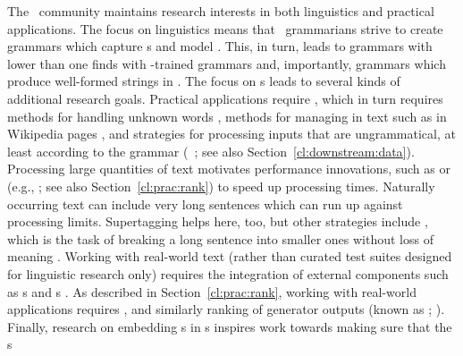 \documentclass[output=paper
	        ,collection
	        ,collectionchapter
 	        ,biblatex
                ,babelshorthands
                ,newtxmath
                ,draftmode
                ,colorlinks, citecolor=brown
]{langscibook}
\begin{document}
The \delphin\ community maintains research interests in both
linguistics and practical applications. The focus on linguistics means
that \delphin\ grammarians strive to create grammars which capture
s and model . This, in turn,
leads to grammars with lower  than one finds with
-trained grammars and, importantly, grammars which produce
well-formed strings in . The focus on s
leads to several kinds of additional research goals. Practical applications
require , which in turn requires methods for handling 
unknown words
\citep[e.g.,][]{chartmapping}, methods for managing  in
text such as in Wikipedia pages \citep[e.g.,][]{FOY2010a-u}, and strategies
for processing inputs that are ungrammatical, at least according to
the grammar (\eg\ \citealp{W11-2923}; see also Section~\ref{cl:downstream:data}).
Processing large quantities of text motivates performance innovations, such as  or  (e.g., \citealp{matsuzaki2007supertag,dridan2013ubertag}; see also Section~\ref{cl:prac:rank}) to speed
up processing times. Naturally occurring text can include very long 
sentences which can run up against processing limits. Supertagging helps here, too, but other strategies include \textit{}, which is the task of breaking a long sentence into smaller ones without loss of meaning \citep{muszynska:2016:ACL-SRW}.
Working with real-world text (rather than curated test suites designed
for linguistic research only) requires 
the integration of external components such as s 
\citep[e.g.,][]{Marimon2013a-u} and s \citep[e.g.,][]{L06-1115,Sch:Usz:Fed:08}. As described in Section~\ref{cl:prac:rank}, working with real-world applications requires  \citep[e.g.,][]{Tou:Man:Fli:Oep:05}, and similarly ranking of generator outputs (known as \textit{}; \citealt[e.g.,][]{Velldal:09}). Finally, research on embedding s in s inspires work  towards making sure that the s
\end{document}
